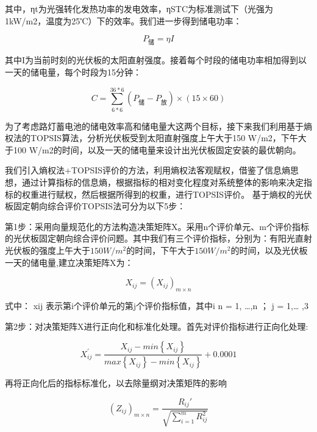 \documentclass[withoutpreface,bwprint]{cumcmthesis} %
\begin{document}
其中，ηt为光强转化发热功率的发电效率，ηSTC为标准测试下（光强为1kW/m2，温度为25℃）下的效率。我们进一步得到储电功率：

\begin{equation}
	P_{储} = \eta I
	\label{eq:013}
\end{equation}

其中I为当前时刻的光伏板的太阳直射强度。接着每个时段的储电功率相加得到以一天的储电量，每个时段为15分钟：

\begin{equation}
	C = \sum_{6*6}^{36*6} (P_{\mbox{储}} - P_{\mbox{放}}) \times (15 \times 60)
	\label{eq:013}
\end{equation}


为了考虑路灯蓄电池的储电效率高和储电量大这两个目标，接下来我们利用基于熵权法的TOPSIS算法，分析光伏板受到太阳直射强度上午大于150 W/m2，下午大于100 W/m2的时间，以及一天的储电量来设计出光伏板固定安装的最优朝向。



我们引入熵权法+TOPSIS评价的方法，利用熵权法客观赋权，借鉴了信息熵思想，通过计算指标的信息熵，根据指标的相对变化程度对系统整体的影响来决定指标的权重进行赋权，然后根据所得到的权重，进行TOPSIS评价。
基于熵权的光伏板固定朝向综合评价TOPSIS法可分为以下5步：

第1步：采用向量规范化的方法构造决策矩阵X。采用n个评价单元、m个评价指标的光伏板固定朝向综合评价问题。其中我们有三个评价指标，分别为：有阳光直射光伏板的强度上午大于$150W/m^2$的时间，下午大于$150W/m^2$的时间，以及光伏板一天的储电量,建立决策矩阵X为：

\begin{equation}
	X_{ij}=\left ( X_{ij} \right )_{m\times n}
	\label{eq:013}
\end{equation}

式中： xij 表示第i个评价单元的第j个评价指标值，其中i n = 1, …,n  ； j = 1,… ,3

第2步：对决策矩阵X进行正向化和标准化处理。首先对评价指标进行正向化处理:



\begin{equation}
	X_{ij}^{'}=\frac{X_{ij}^{}-min\left \{ X_{ij} \right \}}{max\left \{ X_{ij} \right \}-min\left \{ X_{ij} \right \}}+0.0001
	\label{eq:013}
\end{equation}

再将正向化后的指标标准化，以去除量纲对决策矩阵的影响



\begin{equation}
(Z_{ij})_{m\times n}=\frac{R_{ij}'}{\sqrt{\sum_{i=1}^{m}R_{ij}^{2}}}
	\label{eq:013}
\end{equation}
\end{document}
